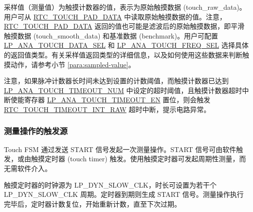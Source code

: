\documentclass[main\_\_CN.tex]{subfiles}
\begin{document}
采样值（测量值）为触摸计数器的值，表示为原始触摸数据 (touch\_raw\_data)。用户可从 \hyperref[fielddesc:RTCTOUCHPAD0DATA]{RTC\_TOUCH\_PAD\_DATA} 中读取原始触摸数据的值。注意，\hyperref[fielddesc:RTCTOUCHPAD0DATA]{RTC\_TOUCH\_PAD\_DATA} 返回的值也可能是滤波后的原始触摸数据，即平滑触摸数据 (touch\_smooth\_data) 和基准数据 (benchmark)。用户可配置 \hyperref[fielddesc:LPANATOUCHDATASEL]{LP\_ANA\_TOUCH\_DATA\_SEL} 和 \hyperref[fielddesc:LPANATOUCHFREQSEL]{LP\_ANA\_TOUCH\_FREQ\_SEL} 选择具体的返回值类型。有关采样值返回类型的详细信息，以及如何使用这些数据来判断触摸动作，请参考小节 \ref{para:sampled-value}。

\begin{tiplisting}
注意，如果脉冲计数器长时间未达到设置的计数阈值，而触摸计数器已达到 \hyperref[fielddesc:LPANATOUCHTIMEOUTNUM]{LP\_ANA\_TOUCH\_TIMEOUT\_NUM} 中设定的超时阈值，且触摸计数器超时中断使能寄存器 \hyperref[fielddesc:LPANATOUCHTIMEOUTEN]{LP\_ANA\_TOUCH\_TIMEOUT\_EN} 置位，则会触发 \\ \hyperref[fielddesc:RTCTOUCHTIMEOUTINTRAW]{RTC\_TOUCH\_TIMEOUT\_INT\_RAW} 超时中断，提示电路异常。
\end{tiplisting}

\subsubsection{测量操作的触发源}

Touch FSM 通过发送 START 信号发起一次测量操作。START 信号可由软件触发，或由触摸定时器 (touch timer) 触发。使用触摸定时器可发起周期性测量，而无需软件介入。

触摸定时器的时钟源为 LP\_DYN\_SLOW\_CLK，时长可设置为若干个 LP\_DYN\_SLOW\_CLK 周期。定时器到期则生成 START 信号。测量操作执行完毕后，定时器计数复位，开始重新计数，直至下次过期。
\end{document}
